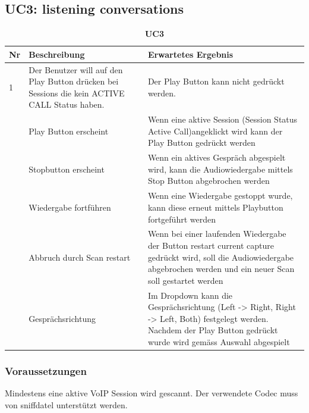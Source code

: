 \documentclass[a4,12pt]{scrartcl}
\begin{document}
\subsection{UC3: listening conversations}
\begin{table}[H]
\centering
    \begin{tabular}{@{} p{0.5cm} p{7cm} p{6cm} @{}}\toprule    
    {Nr} & {Beschreibung} & {Erwartetes Ergebnis}\\ \midrule
    1 & Der Benutzer will auf den Play Button drücken bei Sessions die kein ACTIVE CALL Status haben. & Der Play Button kann nicht gedrückt werden. \\ \addlinespace
    2 & Play Button erscheint & Wenn eine aktive Session (Session Status Active Call)angeklickt wird kann der Play Button gedrückt werden\\ \addlinespace
    3 & Stopbutton erscheint & Wenn ein aktives Gespräch abgespielt wird, kann die Audiowiedergabe mittels Stop Button abgebrochen werden\\ \addlinespace
    4 & Wiedergabe fortführen & Wenn eine Wiedergabe gestoppt wurde, kann diese erneut mittels Playbutton fortgeführt werden\\ \addlinespace
    5 & Abbruch durch Scan restart & Wenn bei einer laufenden Wiedergabe der Button restart current capture gedrückt wird, soll die Audiowiedergabe abgebrochen werden und ein neuer Scan soll gestartet werden\\ \addlinespace
    6 & Gesprächsrichtung & Im Dropdown kann die Gesprächsrichtung (Left -> Right, Right -> Left, Both) festgelegt werden. Nachdem der Play Button gedrückt wurde wird gemäss Auswahl abgespielt\\
    \bottomrule
    \end{tabular}
\caption{\textbf{UC3}}
\end{table}

\subsubsection{Voraussetzungen}
Mindestens eine aktive VoIP Session wird gescannt. Der verwendete Codec muss von sniffdatel unterstützt werden.
\end{document}
